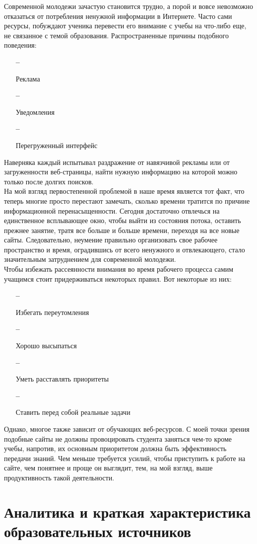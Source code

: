 \documentclass[a4paper, 12pt]{extarticle}
\begin{document}
Современной молодежи зачастую становится трудно, а порой и вовсе невозможно
отказаться от потребления ненужной информации в Интернете. Часто сами ресурсы,
побуждают ученика перевести его внимание с учебы на что-либо еще, не связанное
с темой образования. Распространенные причины подобного поведения:
\begin{itemize}
    \item[\bfseries--] {\small Реклама\par}
    \item[\bfseries--] {\small Уведомления\par}
    \item[\bfseries--] {\small Перегруженный интерфейс\par}
\end{itemize}
Наверняка каждый испытывал раздражение от навязчивой рекламы или от
загруженности веб-страницы, найти нужную информацию на которой можно только
после долгих поисков.
\\

На мой взгляд первостепенной проблемой в наше время является тот факт, что
теперь многие просто перестают замечать, сколько времени тратится по причине
информационной перенасыщенности. Сегодня достаточно отвлечься на единственное
всплывающее окно, чтобы выйти из состояния потока, оставить прежнее занятие,
тратя все больше и больше времени, переходя на все новые сайты. Следовательно,
неумение правильно организовать свое рабочее пространство и время, оградившись от всего
ненужного и отвлекающего, стало значительным затруднением для современной
молодежи.
\\

Чтобы избежать рассеянности внимания во время рабочего процесса самим учащимся
стоит придерживаться некоторых правил. Вот некоторые из них:
\begin{itemize}
    \item[\bfseries--] {\small Избегать переутомления\par}
    \item[\bfseries--] {\small Хорошо высыпаться\par}
    \item[\bfseries--] {\small Уметь расставлять приоритеты\par}
    \item[\bfseries--] {\small Ставить перед собой реальные задачи\par}
\end{itemize}
Однако, многое также зависит от обучающих веб-ресурсов. С моей точки зрения
подобные сайты не должны провоцировать студента заняться чем-то кроме учебы,
напротив, их основным приоритетом должна быть эффективность передачи знаний.
Чем меньше требуется усилий, чтобы приступить к работе на сайте, чем понятнее и
проще он выглядит, тем, на мой взгляд, выше продуктивность такой деятельности.
\newpage

\section{Аналитика и краткая характеристика образовательных источников}
\subsection{}

{}

\end{document}
